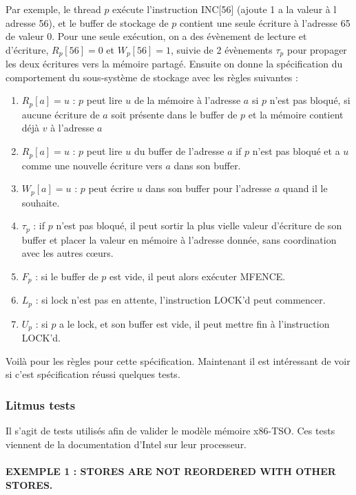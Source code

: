 \documentclass[12pt,a4paper]{article}
\begin{document}
Par exemple, le thread $p$ exécute l'instruction INC[56] (ajoute 1 a la valeur à l adresse 56), et le buffer de stockage de $p$ contient une seule écriture à l'adresse 65 de valeur 0. Pour une seule exécution, on a des évènement de lecture et d'écriture, $R_p[56] = 0$ et $W_p[56] = 1$, suivie de 2 évènements $\tau_p$ pour propager les deux écritures vers la mémoire partagé.
Ensuite on donne la spécification du comportement du sous-système de stockage avec les règles suivantes :
\begin{enumerate}
	\item $R_p[a] = u$ : $p$ peut lire $u$ de la mémoire à l'adresse $a$ si $p$ n'est pas bloqué, si aucune écriture de $a$ soit présente dans le buffer de $p$ et la mémoire contient déjà $v$ à l'adresse $a$
	\item $R_p[a] = u$ : $p$ peut lire $u$ du buffer de l'adresse $a$ if $p$ n'est pas bloqué et a $u$ comme une nouvelle écriture vers $a$ dans son buffer.
	\item $W_p[a] = u$ : $p$ peut écrire $u$ dans son buffer pour l'adresse $a$ quand il le souhaite.
	\item $\tau_p$ : if $p$ n'est pas bloqué, il peut sortir la plus vielle valeur d'écriture de son buffer et placer la valeur en mémoire à l'adresse donnée, sans coordination avec les autres cœurs.
	\item $F_p$ : si le buffer de $p$ est vide, il peut alors exécuter MFENCE.
	\item $L_p$ : si lock n'est pas en attente, l'instruction LOCK'd peut commencer.
	\item $U_p$ : si $p$ a le lock, et son buffer est vide, il peut mettre fin à l'instruction LOCK'd.
\end{enumerate}

Voilà pour les règles pour cette spécification. Maintenant il est intéressant de voir si c'est spécification réussi quelques tests.

\subsubsection*{Litmus tests}

Il s'agit de tests utilisés afin de valider le modèle mémoire x86-TSO. Ces tests viennent de la documentation d'Intel sur leur processeur.

\paragraph{EXEMPLE 1 : STORES ARE NOT REORDERED WITH OTHER STORES.}
\end{document}
